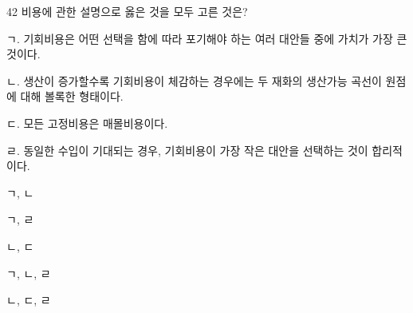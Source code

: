 \begin{question}{42}
비용에 관한 설명으로 옳은 것을 모두 고른 것은?
\begin{framedtext}
ㄱ. 기회비용은 어떤 선택을 함에 따라 포기해야 하는 여러 대안들 중에 가치가 가장 큰 것이다. \par
ㄴ. 생산이 증가할수록 기회비용이 체감하는 경우에는 두 재화의 생산가능 곡선이 원점에 대해 볼록한 형태이다. \par
ㄷ. 모든 고정비용은 매몰비용이다. \par
ㄹ. 동일한 수입이 기대되는 경우, 기회비용이 가장 작은 대안을 선택하는 것이 합리적이다.
\end{framedtext}
\begin{choices}
  \item ㄱ, ㄴ
  \item ㄱ, ㄹ
  \item ㄴ, ㄷ
  \item ㄱ, ㄴ, ㄹ
  \item ㄴ, ㄷ, ㄹ
\end{choices}
\end{question}
